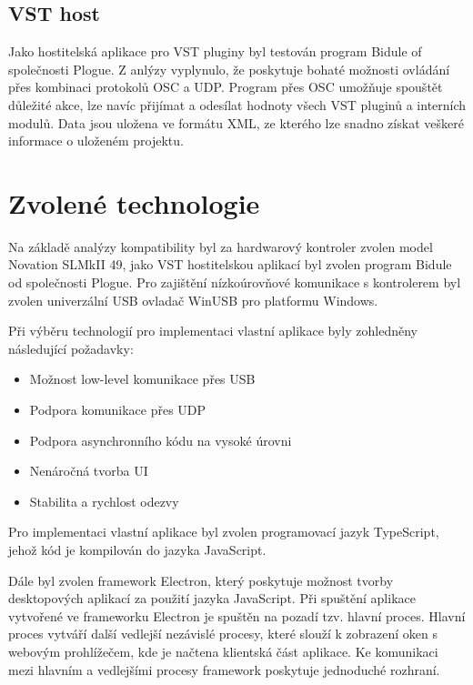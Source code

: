 \documentclass[thesis=M,czech]{FITthesis}[2019/03/06]
\begin{document}
	\subsection{VST host}
	Jako hostitelská aplikace pro VST pluginy byl testován program Bidule of společnosti Plogue.
	Z anlýzy vyplynulo, že poskytuje bohaté možnosti ovládání přes kombinaci protokolů OSC a UDP.
	Program přes OSC umožňuje spouštět důležité akce, lze navíc přijímat a odesílat hodnoty všech VST pluginů a interních modulů.
	Data jsou uložena ve formátu XML, ze kterého lze snadno získat veškeré informace o uloženém projektu.
	
	\section{Zvolené technologie}
	Na základě analýzy kompatibility byl za hardwarový kontroler zvolen model Novation SLMkII 49, jako VST hostitelskou aplikací byl zvolen program Bidule od společnosti Plogue.
	Pro zajištění nízkoúrovňové komunikace s kontrolerem byl zvolen univerzální USB ovladač WinUSB pro platformu Windows.
	
	Při výběru technologií pro implementaci vlastní aplikace byly zohledněny následující požadavky:
	\begin{itemize}
		\item Možnost low-level komunikace přes USB
		\item Podpora komunikace přes UDP
		\item Podpora asynchronního kódu na vysoké úrovni
		\item Nenáročná tvorba UI
		\item Stabilita a rychlost odezvy
	\end{itemize}
	
	Pro implementaci vlastní aplikace byl zvolen programovací jazyk TypeScript, jehož kód je kompilován do jazyka JavaScript.
	
	Dále byl zvolen framework Electron, který poskytuje možnost tvorby desktopových aplikací za použití jazyka JavaScript.
	Při spuštění aplikace vytvořené ve frameworku Electron je spuštěn na pozadí tzv. hlavní proces.
	Hlavní proces vytváří další vedlejší nezávislé procesy, které slouží k zobrazení oken s webovým prohlížečem, kde je načtena klientská část aplikace.
	Ke komunikaci mezi hlavním a vedlejšími procesy framework poskytuje jednoduché rozhraní.
	
\end{document}
